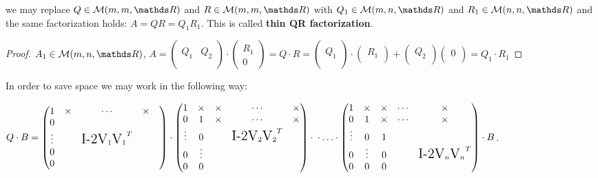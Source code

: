 \documentclass[computationalMathematics.tex]{subfiles}
\begin{document}
\begin{proposition} 
  we may replace $Q \in \mathcal{M}(m, m, \R)$ and $R \in \mathcal{M}(m, m, \R)$ with $Q_1 \in \mathcal{M}(m, n, \R)$ and $R_1 \in \mathcal{M}(n, n, \R)$ and the same factorization holds: $A=QR=Q_1R_1$. This is called \textbf{thin QR factorization}.
\end{proposition}
\begin{proof}
 $A_{1} \in \mathcal{M}(m, n, \R)$, $ A =\begin{pmatrix}
    &\\
    Q_{1} & Q_{2}\\
    &\\
  \end{pmatrix}
  \cdot
  \begin{pmatrix}
    R_{1}\\
    0
  \end{pmatrix}
  =
  Q \cdot R
  =
  \begin{pmatrix}
   \\
    Q_{1}\\
    \\
  \end{pmatrix}
  \cdot
  \begin{pmatrix}
    R_{1}\\
  \end{pmatrix}
  +
  \begin{pmatrix}
    Q_{2}\\
  \end{pmatrix}
  \begin{pmatrix}
    0\\
  \end{pmatrix}
  =
  Q_{1} \cdot R_{1}$
\end{proof}
In order to save space we may work in the following way:

$Q \cdot B =
  \begin{pmatrix}
    1 & \times &\cdots & \times\\
    0 &&&&\\
    \vdots &&\text{\Large I-2V}_1 {\text{\Large V}_1}^{T}&\\
    0 &&&&\\
    0 &&&&
  \end{pmatrix} \cdot 
  \begin{pmatrix}
    1 & \times & \times & \cdots & \times\\
    0 & 1 &\times & \cdots& \times\\
    \vdots & 0 &&\text{\Large I-2V}_2 {\text{\Large V}_2}^{T}\\
    0 & \vdots &&&\\
    0 & 0 &&
  \end{pmatrix}\cdot\\ \cdot \ldots \cdot
  \begin{pmatrix}
    1 & \times & \times & \cdots & \times\\
    0 & 1 & \times & \cdots & \times\\
    \vdots & 0 & 1 &\\
    0 & \vdots & 0 &&\text{\Large I-2V}_n {\text{\Large V}_n}^{T}\\
    0 & 0 & 0 &
  \end{pmatrix} \cdot B$.
\end{document}
